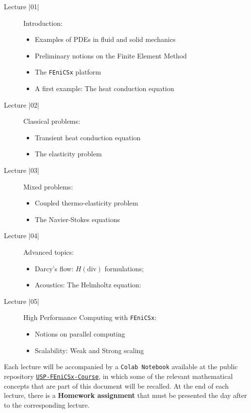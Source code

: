 \begin{description}
	\item[Lecture |01|] Introduction:
	\begin{itemize}
		\item Examples of PDEs in fluid and solid mechanics
		\item Preliminary notions on the Finite Element Method
		\item The \texttt{FEniCSx} platform
		\item A first example: The heat conduction equation
	\end{itemize}
	
	\item[Lecture |02|] Classical problems:
	\begin{itemize}
		\item Transient heat conduction equation
		\item The elasticity problem
	\end{itemize}
	
	\item[Lecture |03|] Mixed problems:
	\begin{itemize}
		\item Coupled thermo-elasticity problem
		\item The Navier-Stokes equations
	\end{itemize}
	
	\item[Lecture |04|] Advanced topics:	
	\begin{itemize}
		\item Darcy's flow: $H(\mbox{div})$ formulations;
		\item Acoustics: The Helmholtz equation: 
	\end{itemize}
	
	\item[Lecture |05|] High Performance Computing with \texttt{FEniCSx}:	
	\begin{itemize}
		\item Notions on parallel computing
		\item Scalability: Weak and Strong scaling
	\end{itemize}
	
\end{description}

Each lecture will be accompanied by a \texttt{Colab Notebook} 
available at the public repository 
\href{https://github.com/IgorBaratta/FEniCSxCourse}{\texttt{USP-FEniCSx-Course}},
in which some of the relevant mathematical concepts that are part of 
this document will be recalled. At the end of each lecture, there is a
\textbf{Homework assignment} that must be presented the day after
to the corresponding lecture. 

